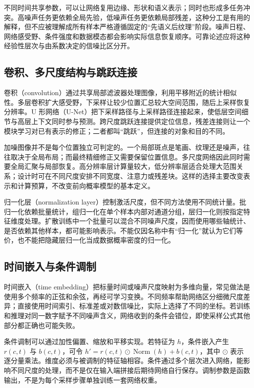 \documentclass[UTF8,12pt,a4paper,fontset=fandol]{ctexart}
\begin{document}
不同时间共享参数，可以让网络复用边缘、形状和语义表示；同时也形成多任务冲突。高噪声任务更依赖全局先验，低噪声任务更依赖局部残差，这种分工是有用的解释，但不应被理解成所有样本严格遵循固定的“先语义后纹理”阶段。噪声日程、网络感受野、条件强度和数据模态都会影响实际信息恢复顺序。可靠论述应将这种经验性层次与由系数决定的信噪比区分开。

\subsection{卷积、多尺度结构与跳跃连接}
卷积（convolution）通过共享局部滤波器处理图像，利用平移附近的统计相似性。多层卷积扩大感受野，下采样让较少位置汇总较大空间范围，随后上采样恢复分辨率。U 形网络（U-Net）把下采样路径与上采样路径连接起来，使低层空间细节与高层上下文同时参与预测。跨尺度跳跃连接提供定位信息，残差连接则让一个模块学习对已有表示的修正；二者都叫“跳跃”，但连接的对象和目的不同。

加噪图像并不是每个位置独立可判定的。一个局部斑点是笔画、纹理还是噪声，往往取决于全局布局；而最终精细修正又需要保留位置信息。多尺度网络因此同时需要全局汇聚与局部恢复。高分辨率层计算量较大，低分辨率层适合处理大范围关系；设计时可在不同尺度安排不同宽度、注意力或残差块。这样的选择主要改变表示和计算预算，不改变前向概率模型的基本定义。

归一化层（normalization layer）控制激活尺度，但不同方法使用不同统计量。批归一化依赖批量统计，组归一化在单个样本内部对通道分组，层归一化则按指定特征维度处理。扩散训练中一个批量可以混合不同噪声尺度，因而使用哪些轴统计、是否依赖其他样本，都可能影响表示。不能仅因名称中有“归一化”就认为它们等价，也不能把隐藏层归一化当成数据概率密度的归一化。

\subsection{时间嵌入与条件调制}
时间嵌入（time embedding）把标量时间或噪声尺度映射为多维向量，常见做法是使用多个频率的正弦和余弦，再经可学习变换。不同频率帮助网络区分细微尺度差异；直接使用时间索引、标准差或对数信噪比，实际上选择了不同的坐标。若训练和推理对同一数字赋予不同噪声含义，网络收到的条件会错位，即使采样公式其他部分都正确也可能失败。

条件调制可以通过加性偏置、缩放和平移实现。若特征为 $h$，条件嵌入产生 $r(c,t)$ 与 $b(c,t)$，可令 $h'=r(c,t)\odot\operatorname{Norm}(h)+b(c,t)$，其中 $\odot$ 表示逐分量乘法。维度必须与被调制的特征轴相容。条件通过多个层次进入网络，能影响不同尺度的处理，而不是仅在输入端拼接后期待网络自行保存。调制参数是函数输出，不是为每个采样步骤单独训练一套网络权重。
\end{document}
